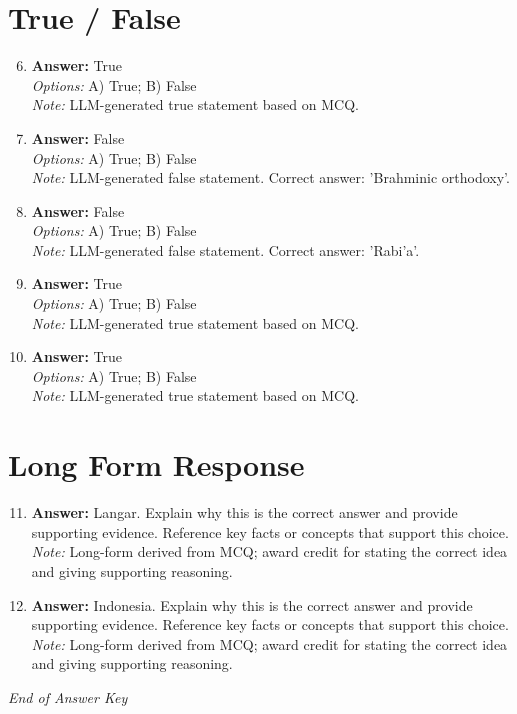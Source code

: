 \documentclass[12pt]{article}
\begin{document}
\section*{True / False}
\begin{enumerate}[label=\arabic*.]
\setcounter{enumi}{5}
\item \textbf{Answer:} True
\\ \textit{Options:} A) True; B) False
\\ \textit{Note:} LLM-generated true statement based on MCQ.
\item \textbf{Answer:} False
\\ \textit{Options:} A) True; B) False
\\ \textit{Note:} LLM-generated false statement. Correct answer: 'Brahminic orthodoxy'.
\item \textbf{Answer:} False
\\ \textit{Options:} A) True; B) False
\\ \textit{Note:} LLM-generated false statement. Correct answer: 'Rabi'a'.
\item \textbf{Answer:} True
\\ \textit{Options:} A) True; B) False
\\ \textit{Note:} LLM-generated true statement based on MCQ.
\item \textbf{Answer:} True
\\ \textit{Options:} A) True; B) False
\\ \textit{Note:} LLM-generated true statement based on MCQ.
\end{enumerate}

\section*{Long Form Response}
\begin{enumerate}[label=\arabic*.]
\setcounter{enumi}{10}
\item \textbf{Answer:} Langar. Explain why this is the correct answer and provide supporting evidence. Reference key facts or concepts that support this choice.
\\ \textit{Note:} Long-form derived from MCQ; award credit for stating the correct idea and giving supporting reasoning.
\item \textbf{Answer:} Indonesia. Explain why this is the correct answer and provide supporting evidence. Reference key facts or concepts that support this choice.
\\ \textit{Note:} Long-form derived from MCQ; award credit for stating the correct idea and giving supporting reasoning.
\end{enumerate}

\vfill
\noindent\textit{End of Answer Key}
\end{document}
